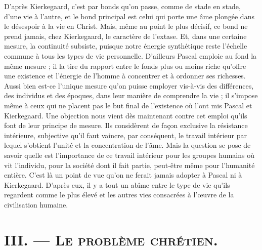 \documentclass[12pt,a4paper]{article}
\newcommand{\opage}[1]{\marginnote{\footnotesize\textit{[#1]}}}
\begin{document}
D'après Kierkegaard, c'est par bonds qu'on passe, comme de
stade en stade, d'une vie à l'autre, et le bond principal est celui qui
porte une âme plongée dans le désespoir à la vie en Christ. Mais,
même au point le plus décisif, ce bond ne prend jamais, chez
Kierkegaard, le caractère de l'extase. Et, dans une certaine mesure,
la continuité subsiste, puisque notre énergie synthétique reste
l'échelle commune à tous les types de vie personnelle. D'ailleurs
\opage{235} Pascal emploie au fond la même mesure ; il la tire du rapport entre
le fonds plus ou moins riche qu'offre une existence et l'énergie de
l'homme à concentrer et à ordonner ses richesses. Aussi bien est-ce
l'unique mesure qu'on puisse employer vis-à-vis des différences,
des individus et des époques, dans leur manière de comprendre
la vie ; il s'impose même à ceux qui ne placent pas le but final de
l'existence où l'ont mis Pascal et Kierkegaard. Une objection nous
vient dès maintenant contre cet emploi qu'ils font de leur principe
de mesure. Ils considèrent de façon exclusive la résistance intérieure,
subjective qu'il faut vaincre, par conséquent, le travail intérieur par lequel s'obtient l'unité et la concentration de l'âme. Mais
la question se pose de savoir quelle est l'importance de ce travail
intérieur pour les groupes humains où vit l'individu, pour la
société dont il fait partie, peut-être même pour l'humanité entière.
C'est là un point de vue qu'on ne ferait jamais adopter à Pascal ni
à Kierkegaard. D'après eux, il y a tout un abîme entre le type de
vie qu'ils regardent comme le plus élevé et les autres vies consacrées à l'œuvre de la civilisation humaine.

\section*{III. --- \textsc{Le problème chrétien.}}
\end{document}
